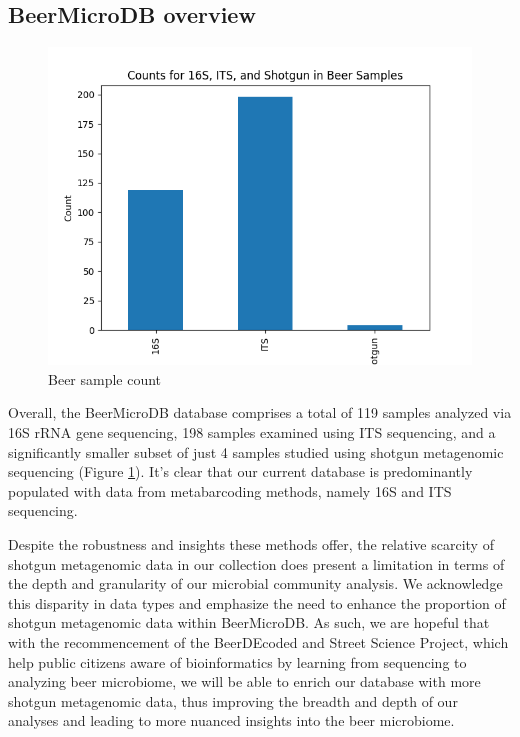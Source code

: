 

\subsection{BeerMicroDB overview}

    \begin{figure}[H]
        \centering
        \includegraphics[scale=0.5]{images/overview/16S_ITS_Shotgun.png}
        \caption{Beer sample count}
        \label{fig:results:beer_sample_count}
    \end{figure}

    Overall, the BeerMicroDB database comprises a total of 119 samples analyzed via 16S rRNA gene sequencing, 198 samples examined using ITS sequencing, and a significantly smaller subset of just 4 samples studied using shotgun metagenomic sequencing (Figure \ref{fig:results:beer_sample_count}). It's clear that our current database is predominantly populated with data from metabarcoding methods, namely 16S and ITS sequencing.
    
    Despite the robustness and insights these methods offer, the relative scarcity of shotgun metagenomic data in our collection does present a limitation in terms of the depth and granularity of our microbial community analysis. We acknowledge this disparity in data types and emphasize the need to enhance the proportion of shotgun metagenomic data within BeerMicroDB. As such, we are hopeful that with the recommencement of the BeerDEcoded and Street Science Project, which help public citizens aware of bioinformatics by learning from sequencing to analyzing beer microbiome, we will be able to enrich our database with more shotgun metagenomic data, thus improving the breadth and depth of our analyses and leading to more nuanced insights into the beer microbiome.


